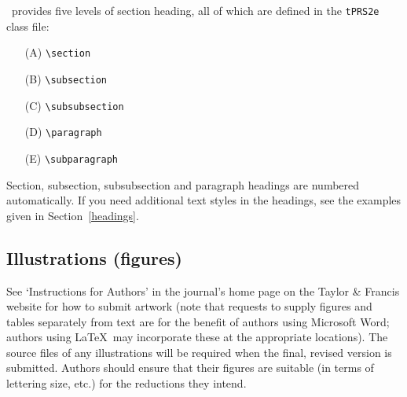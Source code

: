 \documentclass{tPRS2e}
\begin{document}
\LaTeXe\ provides five levels of section heading, all of which are defined in the \texttt{tPRS2e} class file:
\begin{enumerate}
  \item[(A)] \verb"\section"
  \item[(B)] \verb"\subsection"
  \item[(C)] \verb"\subsubsection"
  \item[(D)] \verb"\paragraph"
  \item[(E)] \verb"\subparagraph"
\end{enumerate}
Section, subsection, subsubsection and paragraph headings are numbered automatically. If you need
additional text styles in the headings, see the examples given in Section~\ref{headings}.


\subsection{Illustrations (figures)}

See `Instructions for Authors' in the journal's home page on the Taylor \& Francis website for how to submit artwork (note that requests to supply figures and tables separately from text are for the benefit of authors using Microsoft Word; authors using \LaTeX\ may incorporate these at the appropriate locations). The source files of any illustrations will be required when the final, revised version is submitted. Authors should ensure that their figures are suitable (in terms of lettering size, etc.) for the reductions they intend.
\end{document}
